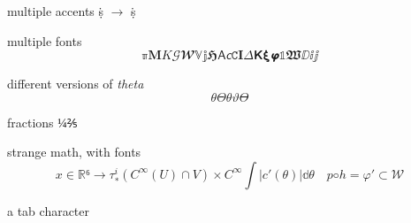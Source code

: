 \documentclass[a4paper,english]{article}
\begin{document}
multiple accents ṩ \(→\)  \.{\d{s}}

multiple fonts
\[ ℼ 𝐌 𝐾 𝒢 𝓦 𝕍 𝕛 𝕳 𝖠 𝘤 𝙲 𝚰 𝛥 𝝟 𝝽 𝞿 𝟙 𝖂 ⅅ ⅈ ⅉ\]



different versions of \emph{theta}
\[\theta Θ  θ  ϑ  ϴ \]

fractions
\(¼ ⅖ \)

strange math, with fonts
\[𝑥 ∈ ℝ⁶→  τ_∗^ i (C ^ ∞ (U ) ∩ V) × 𝐶^ ∞  ∫ |𝑐' (𝜃)| 𝕕𝜃 \quad 𝑝◦ℎ = 𝜑' ⊂ 𝒲\]

a	tab character
\end{document}
